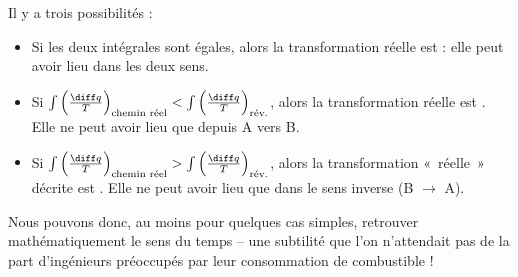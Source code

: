 		Il y a trois possibilités :
			\begin{itemize}
				\item Si les deux intégrales sont égales, alors la transformation réelle est  : elle peut avoir lieu dans les deux sens.
				\item Si $\int \left(\frac{\diff q}{T}\right)_\text{chemin réel} < \int \left(\frac{\diff q}{T}\right)_\text{rév.}$, alors la transformation réelle est . Elle ne peut avoir lieu que depuis A vers B.
				\item Si $\int \left(\frac{\diff q}{T}\right)_\text{chemin réel} > \int \left(\frac{\diff q}{T}\right)_\text{rév.}$, alors la transformation «~réelle~» décrite est . Elle ne peut avoir lieu que dans le sens inverse (B $\to$ A). 
			\end{itemize}
		
		Nous pouvons donc, au moins pour quelques cas simples, retrouver mathématiquement le sens du temps -- une subtilité que l’on n’attendait pas de la part d’ingénieurs préoccupés par leur consommation de combustible !

